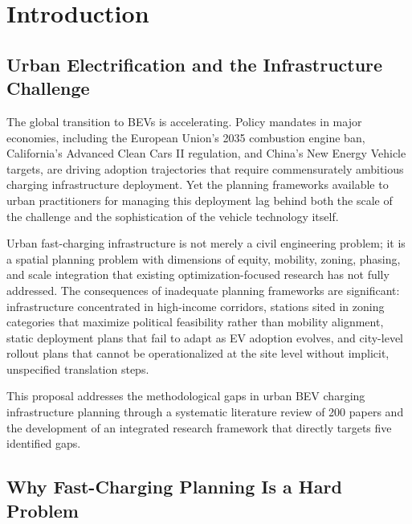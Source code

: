 \documentclass[letterpaper, 12pt, oneside, doublespacing]{Thesis}
\begin{document}
\tableofcontents
\clearpage
\listoffigures
\clearpage
\listoftables
\clearpage

\mainmatter
\fancyhead{}
\fancyfoot[C]{\thepage}
\pagestyle{fancy}

\chapter{Introduction}

\section{Urban Electrification and the Infrastructure Challenge}

The global transition to BEVs is accelerating. Policy mandates in major economies, including the European Union's 2035 combustion engine ban, California's Advanced Clean Cars II regulation, and China's New Energy Vehicle targets, are driving adoption trajectories that require commensurately ambitious charging infrastructure deployment. Yet the planning frameworks available to urban practitioners for managing this deployment lag behind both the scale of the challenge and the sophistication of the vehicle technology itself.

Urban fast-charging infrastructure is not merely a civil engineering problem; it is a spatial planning problem with dimensions of equity, mobility, zoning, phasing, and scale integration that existing optimization-focused research has not fully addressed. The consequences of inadequate planning frameworks are significant: infrastructure concentrated in high-income corridors, stations sited in zoning categories that maximize political feasibility rather than mobility alignment, static deployment plans that fail to adapt as EV adoption evolves, and city-level rollout plans that cannot be operationalized at the site level without implicit, unspecified translation steps.

This proposal addresses the methodological gaps in urban BEV charging infrastructure planning through a systematic literature review of 200 papers and the development of an integrated research framework that directly targets five identified gaps.

\section{Why Fast-Charging Planning Is a Hard Problem}
\end{document}
